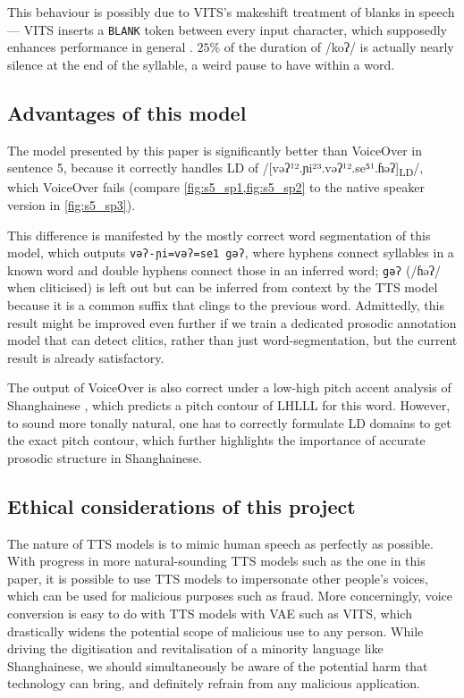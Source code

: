 \documentclass[11pt]{article}
\begin{document}
This behaviour is possibly due to VITS's makeshift treatment of blanks in speech --- VITS inserts a \texttt{BLANK} token between every input character, which supposedly enhances performance in general \citep{kimConditionalVariationalAutoencoder2021}. $25\%$ of the duration of /koʔ/ is actually nearly silence at the end of the syllable, a weird pause to have within a word.

\subsection{Advantages of this model}
The model presented by this paper is significantly better than VoiceOver in sentence 5, because it correctly handles LD of /[vəʔ¹².ɲi²³.vəʔ¹².se⁵¹.ɦəʔ]\textsubscript{LD}/, which VoiceOver fails (compare \cref{fig:s5_sp1,fig:s5_sp2} to the native speaker version in \cref{fig:s5_sp3}).

This difference is manifested by the mostly correct word segmentation of this model, which outputs \texttt{vəʔ-ɲi=vəʔ=se1 gəʔ}, where hyphens connect syllables in a known word and double hyphens connect those in an inferred word; \texttt{gəʔ} (/ɦəʔ/ when cliticised) is left out but can be inferred from context by the TTS model because it is a common suffix that clings to the previous word.
Admittedly, this result might be improved even further if we train a dedicated prosodic annotation model that can detect clitics, rather than just word-segmentation, but the current result is already satisfactory.

The output of VoiceOver is also correct under a low-high pitch accent analysis of Shanghainese \citep{robertsAutosegmentalMetricalModelShanghainese2020}, which predicts a pitch contour of LHLLL for this word. However, to sound more tonally natural, one has to correctly formulate LD domains to get the exact pitch contour, which further highlights the importance of accurate prosodic structure in Shanghainese.

\subsection{Ethical considerations of this project}
The nature of TTS models is to mimic human speech as perfectly as possible.
With progress in more natural-sounding TTS models such as the one in this paper, it is possible to use TTS models to impersonate other people's voices, which can be used for malicious purposes such as fraud.
More concerningly, voice conversion is easy to do with TTS models with VAE such as VITS, which drastically widens the potential scope of malicious use to any person.
While driving the digitisation and revitalisation of a minority language like Shanghainese, we should simultaneously be aware of the potential harm that technology can bring, and definitely refrain from any malicious application.
\end{document}
